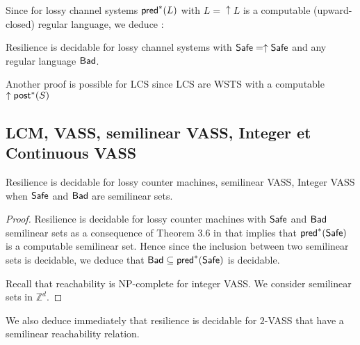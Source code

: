 %

Since for  lossy channel systems $\textsf{pred}^*(L)$ with $L=\uparrow L$ is a computable (upward-closed) regular language, we deduce :

\begin{corollary}
Resilience is decidable for lossy channel systems with $\textsf{Safe}=\uparrow \textsf{Safe}$ and any regular language $\textsf{Bad}$.
\end{corollary}

Another proof is possible for LCS since LCS are WSTS with a computable $\uparrow \textsf{post}^*(S)$ 
%
\subsection{LCM, VASS, semilinear VASS, Integer et Continuous VASS}


\begin{theorem}{}
Resilience is decidable for  lossy counter machines, semilinear VASS, Integer VASS when $\textsf{Safe}$ and $\textsf{Bad}$ are semilinear sets.
\end{theorem}

\begin{proof}
Resilience is decidable for lossy counter machines with $\textsf{Safe}$ and $\textsf{Bad}$ semilinear sets as a consequence of Theorem 3.6 in \cite{DBLP:conf/rp/Schnoebelen10} that implies that $\textsf{pred}^*(\textsf{Safe})$ is a computable semilinear set. Hence since the inclusion between two semilinear sets is decidable, we deduce that  $\textsf{Bad} \subseteq \textsf{pred}^*(\textsf{Safe})$ is decidable.


Recall that reachability is NP-complete for integer VASS. We consider semilinear sets in $\mathbb{Z}^d$.

\end{proof}

We also deduce immediately that resilience is decidable for $2$-VASS that have a semilinear reachability relation.

